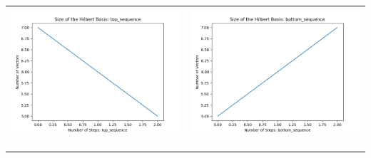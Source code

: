 \documentclass[10pt]{article}
\begin{document}
\begin{tabular}{c|c}
\begin{minipage}{.45\textwidth}
\includegraphics[width=\textwidth]{"DATA/5d/5 generators 1 bound E/top_sequence SIZE"}
\end{minipage} &
\begin{minipage}{.45\textwidth}
\includegraphics[width=\textwidth]{"DATA/5d/5 generators 1 bound E bottomup/bottom_sequence SIZE"}
\end{minipage} \\ \\
\hline \\\begin{minipage}{.45\textwidth}

\end{minipage}
\end{tabular}
\end{document}
